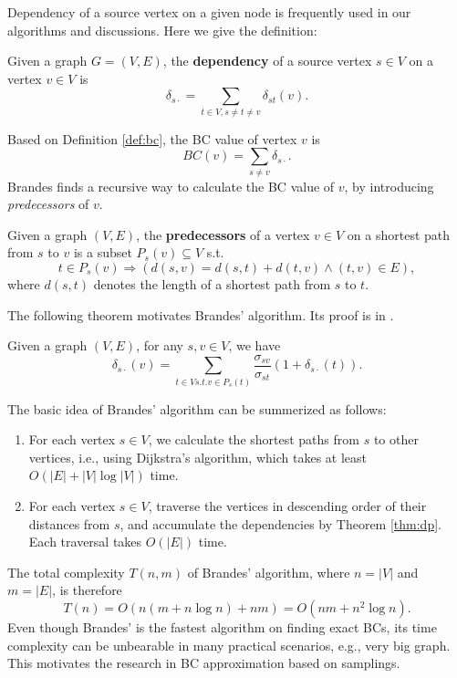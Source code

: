 \documentclass[10pt]{article}
\begin{document}
Dependency of a source vertex on a given node is frequently used in our algorithms and discussions. Here we give the definition: \cite{brandes2001faster}
\begin{definition}
Given a graph $G=(V,E)$, the {\bf dependency} of a source vertex $s\in V$ on a vertex $v\in V$ is
\begin{equation}
\delta_{s\cdot} = \sum_{t\in V, s\not= t\not= v} \delta_{st}(v).
\end{equation}
\end{definition}
Based on Definition \ref{def:bc}, the BC value of vertex $v$ is
\begin{equation}
BC(v) = \sum_{s\not= v} \delta_{s\cdot}.
\end{equation}
Brandes finds a recursive way to calculate the BC value of $v$, by introducing {\it predecessors} of $v$.
\begin{definition}
Given a graph $(V,E)$, the {\bf predecessors} of a vertex $v\in V$ on a shortest path from $s$ to $v$ is a subset $P_s(v)\subseteq V$ s.t.
$$t\in P_s(v) \Rightarrow \left( d(s,v) = d(s,t) + d(t,v) \wedge (t,v)\in E \right),$$
where $d(s,t)$ denotes the length of a shortest path from $s$ to $t$.
\end{definition}
The following theorem motivates Brandes' algorithm. Its proof is in \cite{brandes2001faster}.
\begin{theorem}
\label{thm:dp}
Given a graph $(V,E)$, for any $s,v\in V$, we have
\begin{equation}
\delta_{s\cdot}(v) = \sum_{t\in V s.t. v\in P_s(t)} \frac{\sigma_{sv}}{\sigma_{st}}(1+\delta_{s\cdot}(t)).
\end{equation}
\end{theorem}
The basic idea of Brandes' algorithm can be summerized as follows:
\begin{enumerate}
\item For each vertex $s\in V$, we calculate the shortest paths from $s$ to other vertices, i.e., using Dijkstra's algorithm, which takes at least $O(|E|+|V|\log|V|)$ time.
\item For each vertex $s\in V$, traverse the vertices in descending order of their distances from $s$, and accumulate the dependencies by Theorem \ref{thm:dp}. Each traversal takes $O(|E|)$ time.
\end{enumerate}
The total complexity $T(n,m)$ of Brandes' algorithm, where $n=|V|$ and $m=|E|$, is therefore 
$$T(n) = O(n(m+n\log n)+nm) = O(nm+n^2\log n).$$
Even though Brandes' is the fastest algorithm on finding exact BCs, its time complexity can be unbearable in many practical scenarios, e.g., very big graph. This motivates the research in BC approximation based on samplings.
\end{document}
